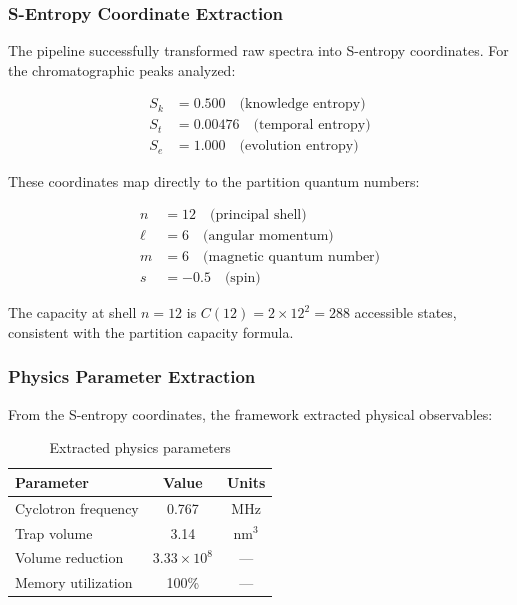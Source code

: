 \documentclass[twocolumn,10pt]{article}
\begin{document}
\subsubsection{S-Entropy Coordinate Extraction}

The pipeline successfully transformed raw spectra into S-entropy coordinates. For the chromatographic peaks analyzed:

\begin{align}
S_k &= 0.500 \quad \text{(knowledge entropy)} \\
S_t &= 0.00476 \quad \text{(temporal entropy)} \\
S_e &= 1.000 \quad \text{(evolution entropy)}
\end{align}

These coordinates map directly to the partition quantum numbers:

\begin{align}
n &= 12 \quad \text{(principal shell)} \\
\ell &= 6 \quad \text{(angular momentum)} \\
m &= 6 \quad \text{(magnetic quantum number)} \\
s &= -0.5 \quad \text{(spin)}
\end{align}

The capacity at shell $n = 12$ is $C(12) = 2 \times 12^2 = 288$ accessible states, consistent with the partition capacity formula.

\subsubsection{Physics Parameter Extraction}

From the S-entropy coordinates, the framework extracted physical observables:

\begin{table}[H]
\centering
\caption{Extracted physics parameters}
\label{tab:physics_params}
\begin{tabular}{lcc}
\toprule
\textbf{Parameter} & \textbf{Value} & \textbf{Units} \\
\midrule
Cyclotron frequency & 0.767 & MHz \\
Trap volume & 3.14 & nm$^3$ \\
Volume reduction & $3.33 \times 10^8$ & --- \\
Memory utilization & 100\% & --- \\
\bottomrule
\end{tabular}
\end{table}
\end{document}
